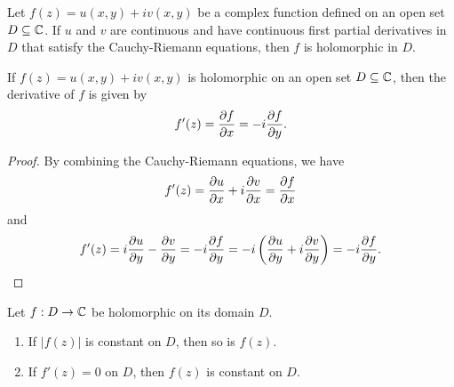 \begin{theorem}
    Let \(f(z) = u(x, y) + iv(x, y)\) be a complex function defined on an open set \(D \subseteq \mathbb{C}\). If \(u\) and \(v\) are continuous and have continuous first partial derivatives in \(D\) that satisfy the Cauchy-Riemann equations, then \(f\) is holomorphic in \(D\).
\end{theorem}

\begin{theorem}
    If \(f(z) = u(x, y) + iv(x, y)\) is holomorphic on an open set \(D \subseteq \mathbb{C}\), then the derivative of \(f\) is given by
    \[
        f'(z) = \frac{\partial f}{\partial x} = -i\frac{\partial f}{\partial y}.
    \]
\end{theorem}

\begin{proof}
    By combining the Cauchy-Riemann equations, we have
    \[
        f'(z) = \frac{\partial u}{\partial x} + i\frac{\partial v}{\partial x} = \frac{\partial f}{\partial x}
    \]
    and
    \[
        f'(z) = i\frac{\partial u}{\partial y} - \frac{\partial v}{\partial y} = -i\frac{\partial f}{\partial y} = -i\left(\frac{\partial u}{\partial y} + i\frac{\partial v}{\partial y}\right) = -i\frac{\partial f}{\partial y}.
    \]
\end{proof}

\begin{theorem}
    Let \(f : D \to \mathbb{C}\) be holomorphic on its domain \(D\).
    \begin{enumerate}[label=(\alph*)]
        \item If \(|f(z)|\) is constant on \(D\), then so is \(f(z)\).
        \item If \(f'(z) = 0\) on \(D\), then \(f(z)\) is constant on \(D\).
    \end{enumerate}
\end{theorem}

